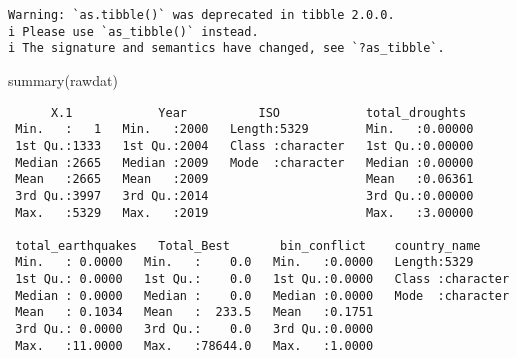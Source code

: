 \documentclass[
  letterpaper,
  DIV=11,
  numbers=noendperiod]{scrartcl}
\newenvironment{Shaded}{\begin{snugshade}}{\end{snugshade}}
\newcommand{\FunctionTok}[1]{\textcolor[rgb]{0.28,0.35,0.67}{#1}}
\newcommand{\NormalTok}[1]{\textcolor[rgb]{0.00,0.23,0.31}{#1}}
\begin{document}
\begin{verbatim}
Warning: `as.tibble()` was deprecated in tibble 2.0.0.
i Please use `as_tibble()` instead.
i The signature and semantics have changed, see `?as_tibble`.
\end{verbatim}

\begin{Shaded}
\begin{Highlighting}[]
\FunctionTok{summary}\NormalTok{(rawdat)}
\end{Highlighting}
\end{Shaded}

\begin{verbatim}
      X.1            Year          ISO            total_droughts   
 Min.   :   1   Min.   :2000   Length:5329        Min.   :0.00000  
 1st Qu.:1333   1st Qu.:2004   Class :character   1st Qu.:0.00000  
 Median :2665   Median :2009   Mode  :character   Median :0.00000  
 Mean   :2665   Mean   :2009                      Mean   :0.06361  
 3rd Qu.:3997   3rd Qu.:2014                      3rd Qu.:0.00000  
 Max.   :5329   Max.   :2019                      Max.   :3.00000  
                                                                   
 total_earthquakes   Total_Best       bin_conflict    country_name      
 Min.   : 0.0000   Min.   :    0.0   Min.   :0.0000   Length:5329       
 1st Qu.: 0.0000   1st Qu.:    0.0   1st Qu.:0.0000   Class :character  
 Median : 0.0000   Median :    0.0   Median :0.0000   Mode  :character  
 Mean   : 0.1034   Mean   :  233.5   Mean   :0.1751                     
 3rd Qu.: 0.0000   3rd Qu.:    0.0   3rd Qu.:0.0000                     
 Max.   :11.0000   Max.   :78644.0   Max.   :1.0000                     
                                                                        

\end{verbatim}
\end{document}
